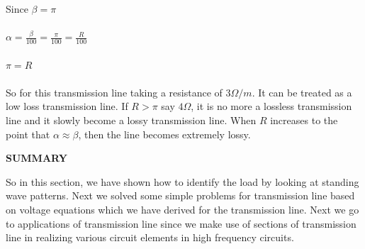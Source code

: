 Since ${\beta = \pi}$\\\\
${\alpha = \frac{\beta}{100} = \frac{\pi}{100} = \frac{R}{100}}$\\\\
${\pi = R}$\\\\ 
So for this transmission line taking a resistance of ${3\Omega /m}$. It can be treated as a low loss transmission line. If ${R>\pi}$ say ${4\Omega}$, it is no more a lossless transmission line and it slowly become a lossy transmission line. When ${R}$ increases to the point that ${\alpha\approx\beta}$, then the line becomes extremely lossy.\newpage

\begin{center}
\textbf{SUMMARY}
\end{center}
So in this section, we have shown how to identify the load by looking at standing wave patterns. Next we solved some simple problems for transmission line based on voltage equations which we have derived for the transmission line. Next we go to applications of transmission line since we make use of sections of transmission line in realizing various circuit elements in high frequency circuits.\\		
